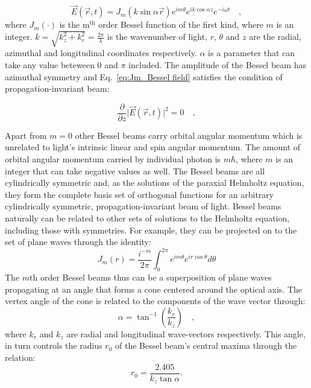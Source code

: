 \begin{equation}
\label{eq:Jm_Bessel field}
\vec{E}(\vec{r},t) = J_{m}(k \sin \alpha \vec{r})e^{im\theta}e^{ik\cos \alpha z}e^{-i\omega t} \quad ,
\end{equation}
where $J_m (\cdot)$ is the $\mathrm{m^{th}}$ order Bessel function of the first kind, where $m$ is an integer. $k = \sqrt{k^2_z + k^2_r} = \frac{2\pi}{\lambda}$ is  the wavenumber of light, $r$, $\theta$ and $z$ are the radial, azimuthal and longitudinal coordinates respectively. $\alpha$ is a parameter that can take any value beteween $0$ and $\pi$ included. The amplitude of the Bessel beam has azimuthal symmetry and Eq.~\eqref{eq:Jm_Bessel field} satisfies the condition of propagation-invariant beam:

\begin{equation}
\label{eq:propagation invariant condition}
\frac{\partial}{\partial z}\vert \vec{E}(\vec{r},t)\vert ^2 = 0 \quad ,
\end{equation}

Apart from $m=0$ other Bessel beams carry orbital angular momentum which is unrelated to light's intrinsic linear and spin angular momentum. The amount of orbital angular momentum carried by individual photon is $m\hbar$, where $m$ is an integer that can take negative values as well. The Bessel beams are all cylindrically symmetric and, as the solutions of the paraxial Helmholtz equation, they form the complete basis set of orthogonal functions for an arbitrary cylindrically symmetric, propagation-invariant beam of light. Bessel beams naturally can be related to other sets of solutions to the Helmholtz equation, including those with symmetries. For example, they can be projected on to the set of plane waves through the identity:
 \begin{equation}
 \label{eq:Bessel Identity relation}
 J_m(r) = \frac{i^{-m}}{2\pi} \int _{0}^{2\pi}e^{im\theta}e^{ir\cos \theta }d\theta
 \end{equation}
The $m$th order Bessel beams thus can be a superposition of plane waves propagating at an angle that forms a cone centered around the optical axis. The vertex angle of the cone is related to the components of the wave vector through:
\begin{equation}
\label{eq:Bessel cone alpha}
\alpha = \tan ^{-1} \left(\frac{k_r}{k_z}\right)\quad ,
\end{equation}
where $k_r$ and $k_z$ are radial and longitudinal wave-vectors respectively. This angle, in turn controls the radius $r_0$ \cite{mcgloin2005} of the Bessel beam's central maxima through the relation:
\begin{equation}
\label{eq:Bessel core spot size}
r_0 = \frac{2.405}{k_z \tan \alpha}.
\end{equation}


